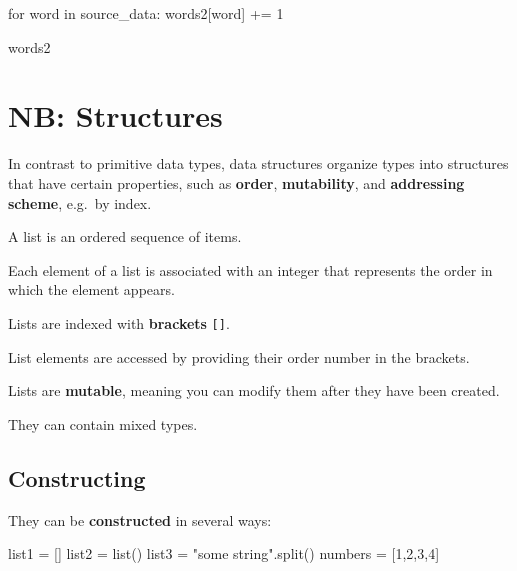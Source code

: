 \documentclass[
  letterpaper,
  DIV=11,
  numbers=noendperiod]{scrreprt}
\newenvironment{Shaded}{\begin{snugshade}}{\end{snugshade}}
\newcommand{\BuiltInTok}[1]{\textcolor[rgb]{0.00,0.23,0.31}{#1}}
\newcommand{\ControlFlowTok}[1]{\textcolor[rgb]{0.00,0.23,0.31}{#1}}
\newcommand{\DecValTok}[1]{\textcolor[rgb]{0.68,0.00,0.00}{#1}}
\newcommand{\KeywordTok}[1]{\textcolor[rgb]{0.00,0.23,0.31}{#1}}
\newcommand{\NormalTok}[1]{\textcolor[rgb]{0.00,0.23,0.31}{#1}}
\newcommand{\OperatorTok}[1]{\textcolor[rgb]{0.37,0.37,0.37}{#1}}
\newcommand{\StringTok}[1]{\textcolor[rgb]{0.13,0.47,0.30}{#1}}
\begin{document}
\begin{Shaded}
\begin{Highlighting}[]
\ControlFlowTok{for}\NormalTok{ word }\KeywordTok{in}\NormalTok{ source\_data:}
\NormalTok{    words2[word] }\OperatorTok{+=} \DecValTok{1}
\end{Highlighting}
\end{Shaded}

\begin{Shaded}
\begin{Highlighting}[]
\NormalTok{words2}
\end{Highlighting}
\end{Shaded}

\hypertarget{nb-structures-1}{%
\chapter{NB: Structures}\label{nb-structures-1}}

In contrast to primitive data types, data structures organize types into
structures that have certain properties, such as \textbf{order},
\textbf{mutability}, and \textbf{addressing scheme}, e.g.~by index.

A list is an ordered sequence of items.

Each element of a list is associated with an integer that represents the
order in which the element appears.

Lists are indexed with \textbf{brackets} \texttt{{[}{]}}.

List elements are accessed by providing their order number in the
brackets.

Lists are \textbf{mutable}, meaning you can modify them after they have
been created.

They can contain mixed types.

\hypertarget{constructing-3}{%
\section{Constructing}\label{constructing-3}}

They can be \textbf{constructed} in several ways:

\begin{Shaded}
\begin{Highlighting}[]
\NormalTok{list1 }\OperatorTok{=}\NormalTok{ []}
\NormalTok{list2 }\OperatorTok{=} \BuiltInTok{list}\NormalTok{()}
\NormalTok{list3 }\OperatorTok{=} \StringTok{"some string"}\NormalTok{.split()}
\NormalTok{numbers }\OperatorTok{=}\NormalTok{ [}\DecValTok{1}\NormalTok{,}\DecValTok{2}\NormalTok{,}\DecValTok{3}\NormalTok{,}\DecValTok{4}\NormalTok{] }
\end{Highlighting}
\end{Shaded}
\end{document}
